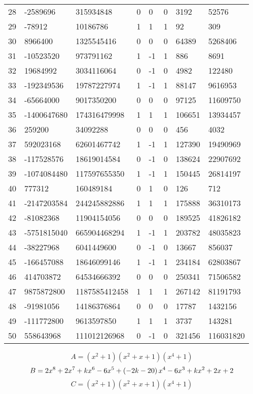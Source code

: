\documentclass{amsart}
\begin{document}
\begin{longtable}{|l|l|l|lllll|}
28&-2589696&315934848&0&0&0&3192&52576\\
29&-78912&10186786&1&1&1&92&309\\
30&8966400&1325545416&0&0&0&64389&5268406\\
31&-10523520&973791162&1&-1&1&886&8691\\
32&19684992&3034116064&0&-1&0&4982&122480\\
33&-192349536&19787227974&1&-1&1&88147&9616953\\
34&-65664000&9017350200&0&0&0&97125&11609750\\
35&-1400647680&174316479998&1&1&1&106651&13934457\\
36&259200&34092288&0&0&0&456&4032\\
37&592023168&62601467742&1&-1&1&127390&19490969\\
38&-117528576&18619014584&0&-1&0&138624&22907692\\
39&-1074084480&117597655350&1&-1&1&150445&26814197\\
40&777312&160489184&0&1&0&126&712\\
41&-2147203584&244245882886&1&1&1&175888&36310173\\
42&-81082368&11904154056&0&0&0&189525&41826182\\
43&-5751815040&665904468294&1&-1&1&203782&48035823\\
44&-38227968&6041449600&0&-1&0&13667&856037\\
45&-166457088&18646099146&1&-1&1&234184&62803867\\
46&414703872&64534666392&0&0&0&250341&71506582\\
47&9875872800&1187585412458&1&1&1&267142&81191793\\
48&-91981056&14186376864&0&0&0&17787&1432156\\
49&-111772800&9613597850&1&1&1&3737&143281\\
50&558643968&111012126968&0&-1&0&321456&116031820\\
\hline
\end{longtable}
$$A=(x^2
 + 1)(x^2
 + x
 + 1)(x^4
 + 1)$$
$$B=2\*x^8
 + 2\*x^7
 + k\*x^6
 - 6\*x^5
 + \left(-2\*k
 - 20\right) \*x^4
 - 6\*x^3
 + k\*x^2
 + 2\*x
 + 2$$
$$C=(x^2
 + 1)(x^2
 + x
 + 1)(x^4
 + 1)$$
\end{document}
